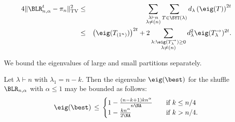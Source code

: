 \documentclass[11pt]{report}
\begin{document}
\begin{eqnarray}
4\lVert \BLR_{n,\alpha}^{t} - \pi_{n} \rVert^{2}_{\textnormal{TV}} & \leq & \sum_{\substack{ \lambda \vdash n \\ \lambda \neq (n)}} \sum_{T \in \SYT(\lambda)} d_{\lambda} \left(\eig(T) \right)^{2t} \nonumber\\ 
& \leq & \left(\eig(T_{(1^{n})})\right)^{2t} + 2\sum_{\substack{\lambda : \eig(T_{\lambda}^{\rightarrow}) \geq 0 \\ \lambda \neq (n)}} d_{\lambda}^{2} \eig(T_{\lambda}^{\rightarrow})^{2t}.\label{chpt5:eqn:biasedbigalpha}
\end{eqnarray}

We bound the eigenvalues of large and small partitions separately.


\begin{lemma}
	\label{lem:genbound1}
	Let $\lambda \vdash n$ with $\lambda_{1} = n-k$. Then the eigenvalue $\eig(\best)$ for the shuffle $\BLR_{n,\alpha}$ with $\alpha \leq1$ may be bounded as follows:
	\[
	\eig(\best) \,\le\, 
	\begin{cases}
	1 - \frac{(n-k+1)kn^{\alpha}}{n\NA} & \quad \text{if $k \le n/4$} \\
	1 - \frac{k n^{\alpha}}{2\NA} & \quad \text{if $k >n/4$.} \\
	\end{cases}
	\]
\end{lemma}
\end{document}
